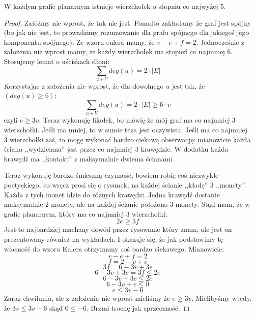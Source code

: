 \begin{theorem}
	W każdym grafie planarnym istnieje wierzchołek o stopniu co najwyżej 5.
\end{theorem}
\begin{proof}
	Załóżmy nie wprost, że tak nie jest. Ponadto zakładamy że graf jest spójny (bo jak nie jest, to prowadzimy rozumowanie dla grafu spójnego dla jakiegoś jego komponentu spójnego). Ze wzoru eulera mamy, że \(v - e + f = 2\). Jednocześnie z założenia nie wprost mamy, że każdy wierzchołek ma stopień co najmniej 6. Stosujemy lemat o uściskach dłoni:
	\begin{equation*}
		\sum_{u \in V} deg(u) = 2 \cdot |E|
	\end{equation*}
	Korzystając z założenia nie wprost, że dla dowolnego \(u\) jest tak, że \((deg(u) \geq 6)\):
	\begin{equation*}
		\sum_{u \in V} deg(u) = 2 \cdot |E| \geq 6 \cdot v
	\end{equation*}
	czyli \(e \geq 3v \). Teraz wykonuję fikołek, bo mówię że mój graf ma co najmniej 3 wierzchołki. Jeśli ma mniej, to w sumie teza jest oczywista. Jeśli ma co najmniej 3 wierzchołki zaś, to mogę wykonać bardzo ciekawą obserwację: mianowicie każda ściana ,,wydzielana'' jest przez co najmniej 3 krawędzie. W dodatku każda krawędź ma ,,kontakt'' z maksymalnie dwiema ścianami.

	Teraz wykonuję bardzo śmieszną czynność, bowiem robię coś niezwykle poetyckiego, co wręcz prosi się o rysunek; na każdej ścianie ,,kładę'' 3 ,,monety''. Każda z tych monet idzie do różnych krawędzi. Jedna krawędź dostanie maksymalnie 2 monety, ale na każdej ścianie położono 3 monety. Stąd mam, że w grafie planarnym, który ma co najmniej 3 wierzchołki:
	\begin{equation*}
		2e \geq 3f
	\end{equation*}
	Jest to najbardziej machany dowód przez rysowanie który znam, ale jest on prezentowany również na wykładach. I okazuje się, że jak podstawimy tę własność do wzoru Eulera otrzymamy coś bardzo ciekawego. Mianowicie:
	\begin{equation*}
		v - e + f = 2
	\end{equation*}
	\begin{equation*}
		f = 2 - v + e
	\end{equation*}
	\begin{equation*}
		3f = 6 - 3v + 3e
	\end{equation*}
	\begin{equation*}
		6 - 3v + 3e = 3f \leq 2e
	\end{equation*}
	\begin{equation*}
		6 - 3v + 3e \leq 2e
	\end{equation*}
	\begin{equation*}
		6 - 3v + e \leq 0
	\end{equation*}
	\begin{equation*}
		e \leq 3v - 6
	\end{equation*}
	Zaraz chwilunia, ale z założenia nie wprost mieliśmy że \(e \geq 3v\). Mielibyśmy wtedy, że \(3v \leq 3v-6\) skąd \(0 \leq -6\). Brzmi trochę jak sprzeczność.
\end{proof}


